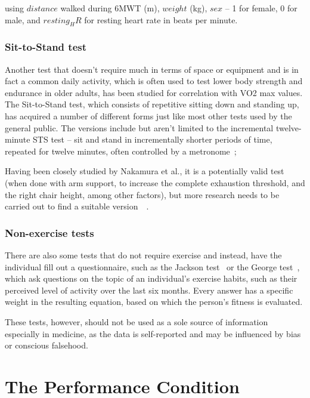 using $distance$ walked during 6MWT (m), $weight$ (kg), $sex$ -- 1 for female, 0 for male, and $resting_HR$ for resting heart rate in beats per minute.

\subsubsection*{Sit-to-Stand test}

Another test that doesn't require much in terms of space or equipment and is in fact a common daily activity, which is often used to test lower body strength and endurance in older adults, has been studied for correlation with VO2 max values.
The Sit-to-Stand test, which consists of repetitive sitting down and standing up, has acquired a number of different forms just like most other tests used by the general public.
The versions include but aren't limited to the incremental twelve-minute STS test -- sit and stand in incrementally shorter periods of time, repeated for twelve minutes, often controlled by a metronome~\cite{seat-height-sit-to-stand};

Having been closely studied by Nakamura et al., it is a potentially valid test (when done with arm support, to increase the complete exhaustion threshold, and the right chair height, among other factors), but more research needs to be carried out to find a suitable version~\cite{frequencies-sit-to-stand}~\cite{validity-sit-to-stand}.

\subsubsection*{Non-exercise tests}

There are also some tests that do not require exercise and instead, have the individual fill out a questionnaire, such as the Jackson test~\cite{nonexercise-vo2max-test-jackson} or the George test~\cite{nonexercise-vo2max-test-george},
which ask questions on the topic of an individual's exercise habits, such as their perceived level of activity over the last six months.
Every answer has a specific weight in the resulting equation, based on which the person's fitness is evaluated.

These tests, however, should not be used as a sole source of information especially in medicine, as the data is self-reported and may be influenced by bias or conscious falsehood.

\section{The Performance Condition}

